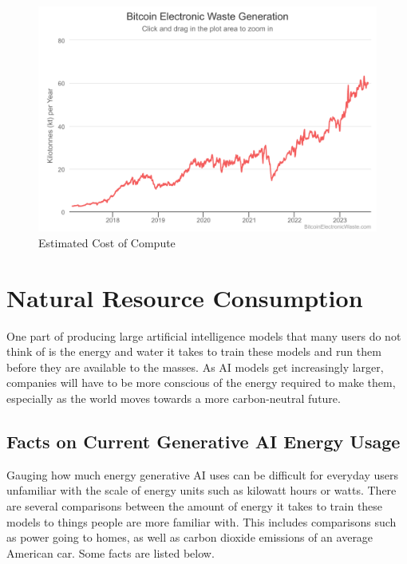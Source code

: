 \documentclass[
]{book}
\begin{document}
\begin{figure}
\centering
\includegraphics{figures/figure3.png}
\caption{Estimated Cost of Compute}
\end{figure}

\hypertarget{natural-resource-consumption}{%
\chapter{Natural Resource Consumption}\label{natural-resource-consumption}}

One part of producing large artificial intelligence models that many users do not think of is the energy and water it takes to train these models and run them before they are available to the masses. As AI models get increasingly larger, companies will have to be more conscious of the energy required to make them, especially as the world moves towards a more carbon-neutral future.

\hypertarget{facts-on-current-generative-ai-energy-usage}{%
\section{Facts on Current Generative AI Energy Usage}\label{facts-on-current-generative-ai-energy-usage}}

Gauging how much energy generative AI uses can be difficult for everyday users unfamiliar with the scale of energy units such as kilowatt hours or watts. There are several comparisons between the amount of energy it takes to train these models to things people are more familiar with. This includes comparisons such as power going to homes, as well as carbon dioxide emissions of an average American car. Some facts are listed below.
\end{document}
